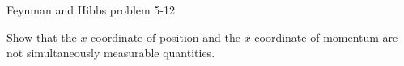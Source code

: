 \documentclass[12pt]{article}
\begin{document}
\begin{center}
Feynman and Hibbs problem 5-12
\end{center}

Show that the $x$ coordinate of position and the
$x$ coordinate of momentum are not simultaneously
measurable quantities.
\end{document}
